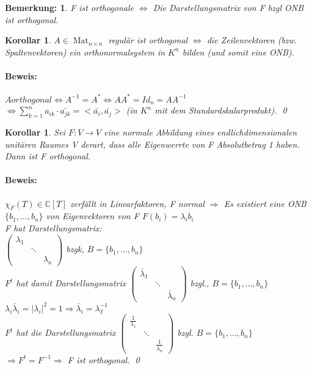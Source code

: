 \documentclass{report}
\newcommand{\lb}{\lambda}
\newcommand{\C}{\mathbb{C}}
\newcommand{\ve}[1]{{\begin{pmatrix}#1 \end{pmatrix}}}
\DeclareMathOperator{\Mat}{Mat}
\theoremstyle{customrem}
\newtheorem*{bemerkung}{Bemerkung\textnormal:}
\theoremstyle{customdef}
\newtheorem{korrolar}[definition]{Korollar}
\renewenvironment{proof}{\paragraph{Beweis: }}{\qed}
\theoremstyle{customenv}
\begin{document}
\begin{bemerkung}
  F ist orthogonale \(\Leftrightarrow\) Die Darstellungsmatrix von F bzgl ONB 
  ist orthogonal.
\end{bemerkung}

\begin{korrolar}
  \(A \in \Mat_{n \times n}\) regul\"ar ist orthogonal \(\Leftrightarrow\)
  die Zeilenvektoren (bzw. Spaltenvektoren) ein orthonormalsystem in \(K^n\)
  bilden (und somit eine ONB).
  \begin{proof}
    \(A orthogonal
    \Leftrightarrow A^{-1} = A^*
    \Leftrightarrow AA^* = Id_n = A A^{-1}\)\\
    \(\Leftrightarrow \sum_{k=1}^n a_{ik} \cdot \bar{a_{jk}} =
    <\bar{a_i}, \bar{a_j}>\) (in \(K^n\) mit dem Standardskalarprodukt).
  \end{proof}
\end{korrolar}

\begin{korrolar}
  Sei \(F : V \to V\) eine normale Abbildung eines endlichdimensionalen
  unit\"aren Raumes V derart, dass alle Eigenwerrte von F Absolutbetrag 1 haben.
  Dann ist F orthogonal.
  \begin{proof}
    \(\chi_F(T) \in \C[T]\) zerf\"allt in Linearfaktoren, F normal
    \(\Rightarrow\) Es existiert eine ONB \(\{b_1,\dots, b_n\}\) von
    Eigenvektoren von F \(F(b_i) = \lb_i b_i\)\\
    F hat Darstellungsmatrix:\\
    \(\ve{
    \lb_1\\
    &\ddots\\
    &&\lb_n
  }\) bzgk, \(B = \{b_1, \dots, b_n\}\)\\
    \(F^t\) hat damit Darstellungsmatrix
    \(\ve{
    \bar\lb_1\\
    &\ddots\\
    &&\bar\lb_n
  }\) bzgl., \(B = \{b_1, \dots, b_n\}\)\\
  \(\lb_i \bar\lb_i = |\lb_i|^2 = 1 \Rightarrow \bar\lb_i = \lb_I^{-1}\)\\
    \(F^t\) hat die Darstellungsmatrix
    \(
    \ve {
      \frac{1}{\lb_1}\\
      &\ddots\\
      &&\frac{1}{\lb_n}
    }
    \)
    bzgl. \(B = \{b_1, \dots, b_n\}\)
    \(\Rightarrow F^t = F^{-1} \Rightarrow\) F ist orthogonal.
  \end{proof}
\end{korrolar}
\end{document}
